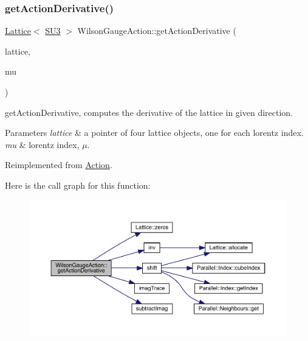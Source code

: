 \subsubsection{\texorpdfstring{getActionDerivative()}{getActionDerivative()}}
{\footnotesize\ttfamily \mbox{\hyperlink{class_lattice}{Lattice}}$<$ \mbox{\hyperlink{class_s_u3}{S\+U3}} $>$ Wilson\+Gauge\+Action\+::get\+Action\+Derivative (\begin{DoxyParamCaption}\item[{\mbox{\hyperlink{class_lattice}{Lattice}}$<$ \mbox{\hyperlink{class_s_u3}{S\+U3}} $>$ $\ast$}]{lattice,  }\item[{int}]{mu }\end{DoxyParamCaption})\hspace{0.3cm}{\ttfamily [virtual]}}



get\+Action\+Derivative, computes the derivative of the lattice in given direction. 


\begin{DoxyParams}{Parameters}
{\em lattice} & a pointer of four lattice objects, one for each lorentz index. \\
\hline
{\em mu} & lorentz index, $\mu$. \\
\hline
\end{DoxyParams}


Reimplemented from \mbox{\hyperlink{class_action_a78168dd7c3819a3365e28fc1aae1b9b6}{Action}}.

Here is the call graph for this function\+:\nopagebreak
\begin{figure}[H]
\begin{center}
\leavevmode
\includegraphics[width=350pt]{class_wilson_gauge_action_a43cf939cd53495b7225fbeaa8a0ff6e8_cgraph}
\end{center}
\end{figure}
\mbox{\label{class_wilson_gauge_action_a60f2892e61489004df3cde6cc856b00b}} 
